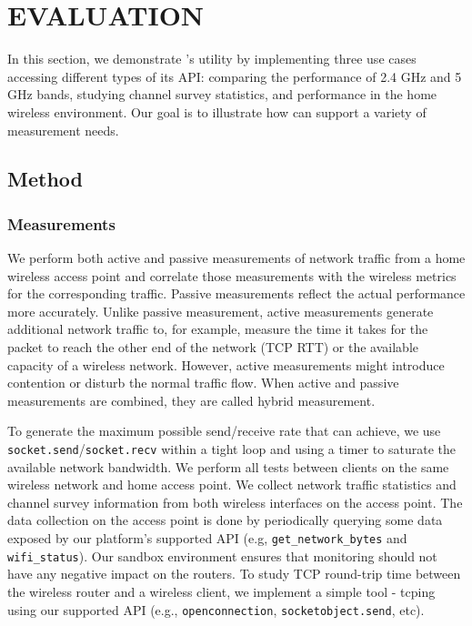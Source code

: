 \chapter{EVALUATION} 
\label{sec.evaluation}
In this section, we demonstrate \sysname's utility by implementing three use cases accessing different types of its API: comparing the performance of 2.4 GHz and 5 GHz bands, studying channel survey statistics, and performance in the home wireless environment. Our goal is to illustrate how \sysname can support a variety of measurement needs.
\section{Method}
\subsection{Measurements}
\label{ssec.measurements}

We perform both active and passive measurements of network traffic from a home wireless access point and correlate those measurements with the wireless metrics for the corresponding traffic. Passive measurements reflect the actual performance more accurately. Unlike passive measurement, active measurements generate additional network traffic to, for example, measure the time it takes for the packet to reach the other end of the network (TCP RTT) or the available capacity of a wireless network. However, active measurements might introduce contention or disturb the normal traffic flow. When active and passive measurements are combined, they are called hybrid measurement. 

To generate the maximum possible send/receive rate that \sysname can achieve, we use \texttt{socket.send}/\texttt{socket.recv} within a tight loop and using a timer to saturate the available network bandwidth. We perform all tests between clients on the same wireless network and home access point. We collect network traffic statistics and channel survey information from both wireless interfaces on the access point. The data collection on the access point is done by periodically querying some data exposed by our platform's supported API (e.g, \texttt{get\_network\_bytes} and \texttt{wifi\_status}). Our sandbox environment ensures that monitoring should not have any negative impact on the routers. To study TCP round-trip time between the wireless router and a wireless client, we implement a simple tool - tcping using our supported API (e.g., \texttt{openconnection}, \texttt{socketobject.send}, etc). 
 

